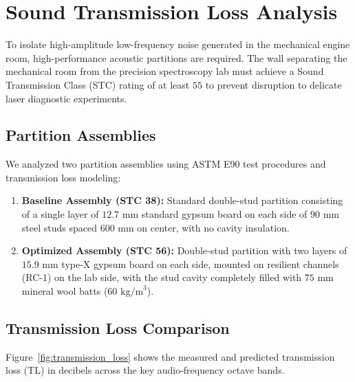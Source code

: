 \section{Sound Transmission Loss Analysis}\label{sec:mitigation}
To isolate high-amplitude low-frequency noise generated in the mechanical engine room, high-performance acoustic partitions are required. The wall separating the mechanical room from the precision spectroscopy lab must achieve a Sound Transmission Class (STC) rating of at least $55$ to prevent disruption to delicate laser diagnostic experiments.

\subsection{Partition Assemblies}
We analyzed two partition assemblies using ASTM E90 test procedures and transmission loss modeling:
\begin{enumerate}
    \item \textbf{Baseline Assembly (STC 38):} Standard double-stud partition consisting of a single layer of $12.7\text{~mm}$ standard gypsum board on each side of $90\text{~mm}$ steel studs spaced $600\text{~mm}$ on center, with no cavity insulation.
    \item \textbf{Optimized Assembly (STC 56):} Double-stud partition with two layers of $15.9\text{~mm}$ type-X gypsum board on each side, mounted on resilient channels (RC-1) on the lab side, with the stud cavity completely filled with $75\text{~mm}$ mineral wool batts ($60\text{~kg/m}^3$).
\end{enumerate}

\subsection{Transmission Loss Comparison}
Figure~\ref{fig:transmission_loss} shows the measured and predicted transmission loss (TL) in decibels across the key audio-frequency octave bands.

